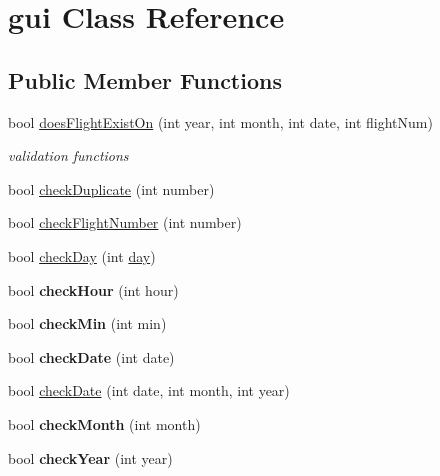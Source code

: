 \hypertarget{classgui}{
\section{gui Class Reference}
\label{classgui}
}
\subsection*{Public Member Functions}
\begin{DoxyCompactItemize}
\item 
bool \hyperlink{classgui_ac5c78b3942440eb0619eeb87d61311d6}{doesFlightExistOn} (int year, int month, int date, int flightNum)
\begin{DoxyCompactList}\small\item\em validation functions \item\end{DoxyCompactList}\item 
bool \hyperlink{classgui_a56286e7605a615ea09443ea66f3eca58}{checkDuplicate} (int number)
\item 
bool \hyperlink{classgui_a68a8c8fdbcf6ca93ea3d1233443b185c}{checkFlightNumber} (int number)
\item 
bool \hyperlink{classgui_ad07e2e40af400425176862a1d82f59c8}{checkDay} (int \hyperlink{classday}{day})
\item 
\hypertarget{classgui_a0fb5a970bd3101f1fb83eba432aef754}{
bool {\bfseries checkHour} (int hour)}
\label{classgui_a0fb5a970bd3101f1fb83eba432aef754}

\item 
\hypertarget{classgui_ae702b9f87e2f9074cd30eeccb6150887}{
bool {\bfseries checkMin} (int min)}
\label{classgui_ae702b9f87e2f9074cd30eeccb6150887}

\item 
\hypertarget{classgui_a1fd54934da3b21ecc179ab7faf54eea2}{
bool {\bfseries checkDate} (int date)}
\label{classgui_a1fd54934da3b21ecc179ab7faf54eea2}

\item 
bool \hyperlink{classgui_a29e87d6cb929726a430bdd4ce93163d9}{checkDate} (int date, int month, int year)
\item 
\hypertarget{classgui_a2985905f8286f28c55991be0183162c6}{
bool {\bfseries checkMonth} (int month)}
\label{classgui_a2985905f8286f28c55991be0183162c6}

\item 
\hypertarget{classgui_aa6256062f6a2f79646c5527f7a0578bd}{
bool {\bfseries checkYear} (int year)}
\label{classgui_aa6256062f6a2f79646c5527f7a0578bd}


\end{DoxyCompactItemize}
